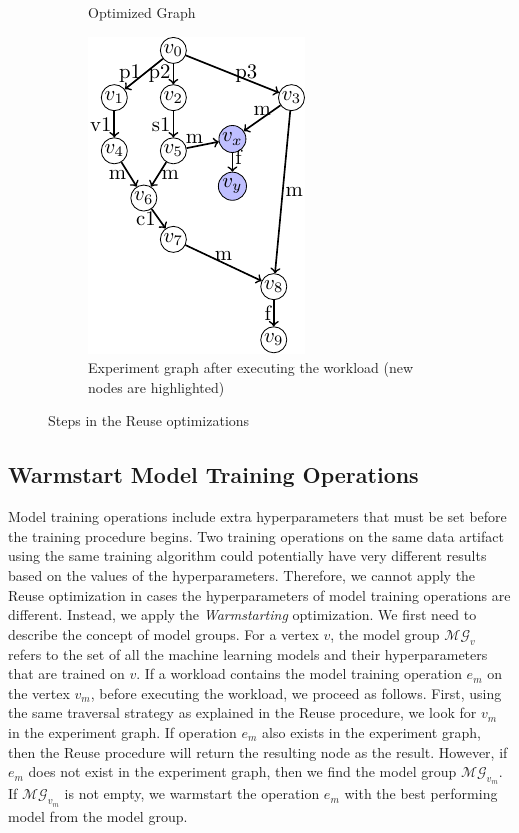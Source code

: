 \begin{figure}
\begin{subfigure}[t]{0.33\linewidth}
\caption{Optimized Graph}
\end{subfigure}
\begin{subfigure}[t]{\linewidth}
\centering
\includegraphics{../images/tikz-standalone/reuse-example-final-eg}
\caption{Experiment graph after executing the workload (new nodes are highlighted)}
\end{subfigure}
\caption{Steps in the Reuse optimizations}
\label{fig-reuse}
\end{figure}

\subsection{Warmstart Model Training Operations}
Model training operations include extra hyperparameters that must be set before the training procedure begins.
Two training operations on the same data artifact using the same training algorithm could potentially have very different results based on the values of the hyperparameters.
Therefore, we cannot apply the Reuse optimization in cases the hyperparameters of model training operations are different.
Instead, we apply the \textit{Warmstarting} optimization.
We first need to describe the concept of model groups.
For a vertex $v$, the model group $\mathcal{MG}_v$ refers to the set of all the machine learning models and their hyperparameters that are trained on $v$.
If a workload contains the model training operation $e_{m}$ on the vertex $v_{m}$, before executing the workload, we proceed as follows.
First, using the same traversal strategy as explained in the Reuse procedure, we look for $v_{m}$ in the experiment graph.
If operation $e_{m}$ also exists in the experiment graph, then the Reuse procedure will return the resulting node as the result.
However, if $e_{m}$ does not exist in the experiment graph, then we find the model group $\mathcal{MG}_{v_m}$.
If $\mathcal{MG}_{v_m}$ is not empty, we warmstart the operation $e_{m}$ with the best performing model from the model group.

